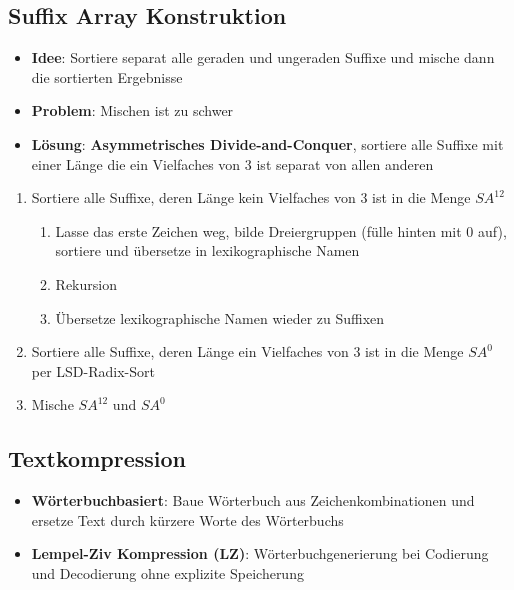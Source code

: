 \documentclass[10pt,a4paper]{article}
\begin{document}
	\subsection{Suffix Array Konstruktion}
	\label{str:sub:suffix_array_konstruktion}
	
	\begin{itemize}
		\item \textbf{Idee}: Sortiere separat alle geraden und ungeraden Suffixe und mische dann die sortierten Ergebnisse
		\item \textbf{Problem}: Mischen ist zu schwer
		\item \textbf{Lösung}: \textbf{Asymmetrisches Divide-and-Conquer}, sortiere alle Suffixe mit einer Länge die ein Vielfaches von 3 ist separat von allen anderen
	\end{itemize}

	\begin{enumerate}
		\item Sortiere alle Suffixe, deren Länge kein Vielfaches von $3$ ist in die Menge $SA^{12}$
		\begin{enumerate}
			\item Lasse das erste Zeichen weg, bilde Dreiergruppen (fülle hinten mit $0$ auf), sortiere und übersetze in lexikographische Namen
			\item Rekursion %
			\item Übersetze lexikographische Namen wieder zu Suffixen
		\end{enumerate}
		\item Sortiere alle Suffixe, deren Länge ein Vielfaches von $3$ ist in die Menge $SA^0$ per LSD-Radix-Sort
		\item Mische $SA^{12}$ und $SA^0$
	\end{enumerate}

	\subsection{Textkompression}
	\label{str:sub:textkompression}
	
	\begin{itemize}
		\item \textbf{Wörterbuchbasiert}: Baue Wörterbuch aus Zeichenkombinationen und ersetze Text durch kürzere Worte des Wörterbuchs
		\item \textbf{Lempel-Ziv Kompression (LZ)}: Wörterbuchgenerierung bei Codierung und Decodierung ohne explizite Speicherung
	\end{itemize}
\end{document}
